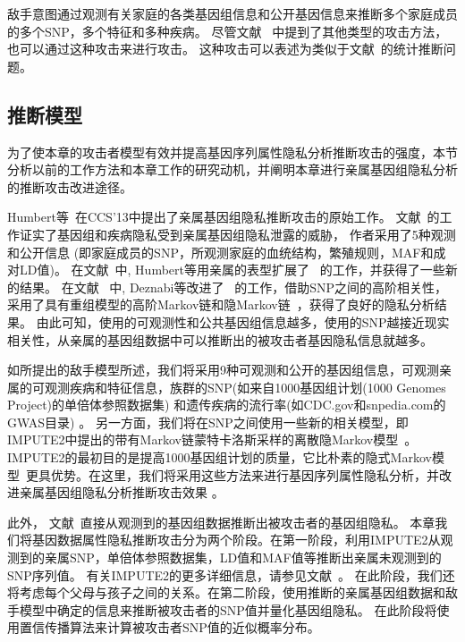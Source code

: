 敌手意图通过观测有关家庭的各类基因组信息和公开基因信息来推断多个家庭成员的多个SNP，多个特征和多种疾病。 尽管文献~\cite{humbert2013addressing} 中提到了其他类型的攻击方法，也可以通过这种攻击来进行攻击。 这种攻击可以表述为类似于文献~\cite{humbert2013addressing,humbert2017quantifying,deznabi2018inference}的统计推断问题。

\subsection{推断模型}

为了使本章的攻击者模型有效并提高基因序列属性隐私分析推断攻击的强度，本节分析以前的工作方法和本章工作的研究动机，并阐明本章进行亲属基因组隐私分析的推断攻击改进途径。

Humbert等~\cite{humbert2013addressing}在CCS'13中提出了亲属基因组隐私推断攻击的原始工作。 文献~\cite{humbert2013addressing}的工作证实了基因组和疾病隐私受到亲属基因组隐私泄露的威胁， 作者采用了5种观测和公开信息 (即家庭成员的SNP，所观测家庭的血统结构，繁殖规则，MAF和成对LD值)。 在文献~\cite{humbert2017quantifying}中, Humbert等用亲属的表型扩展了~\cite{humbert2013addressing} 的工作，并获得了一些新的结果。
在文献~\cite{deznabi2018inference} 中, Deznabi等改进了~\cite{humbert2013addressing} 的工作，借助SNP之间的高阶相关性，采用了具有重组模型的高阶Markov链和隐Markov链~\cite{marchini2007newa,samani2015quantifying}，获得了良好的隐私分析结果。
由此可知，使用的可观测性和公共基因组信息越多，使用的SNP越接近现实相关性，从亲属的基因组数据中可以推断出的被攻击者基因隐私信息就越多。

如所提出的敌手模型所述，我们将采用9种可观测和公开的基因组信息，可观测亲属的可观测疾病和特征信息，族群的SNP(如来自1000基因组计划(1000 Genomes Project)的单倍体参照数据集) 和遗传疾病的流行率(如CDC.gov和snpedia.com的GWAS目录) 。 另一方面，我们将在SNP之间使用一些新的相关模型，即IMPUTE2中提出的带有Markov链蒙特卡洛斯采样的离散隐Markov模型~\cite{howie2014impute2}。IMPUTE2的最初目的是提高1000基因组计划的质量，它比朴素的隐式Markov模型~\cite{marchini2007newa,samani2015quantifying}更具优势。在这里，我们将采用这些方法来进行基因序列属性隐私分析，并改进亲属基因组隐私分析推断攻击效果 。

此外， 文献~\cite{humbert2013addressing,humbert2017quantifying,deznabi2018inference}直接从观测到的基因组数据推断出被攻击者的基因组隐私。 本章我们将基因数据属性隐私推断攻击分为两个阶段。在第一阶段，利用IMPUTE2从观测到的亲属SNP，单倍体参照数据集，LD值和MAF值等推断出亲属未观测到的SNP序列值。 有关IMPUTE2的更多详细信息，请参见文献~\cite{howie2014impute2}。
在此阶段，我们还将考虑每个父母与孩子之间的关系。在第二阶段，使用推断的亲属基因组数据和敌手模型中确定的信息来推断被攻击者的SNP值并量化基因组隐私。 在此阶段将使用置信传播算法来计算被攻击者SNP值的近似概率分布。

